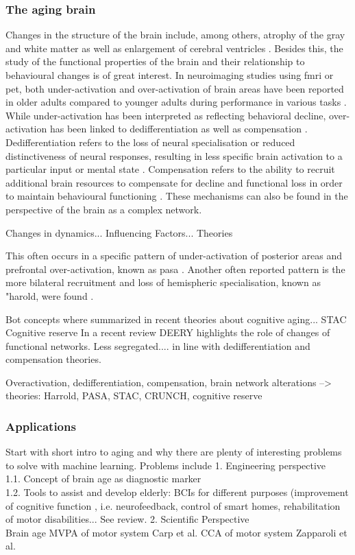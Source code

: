 \subsubsection{The aging brain}
Changes in the structure of the brain include, among others, atrophy of the gray and white matter as well as enlargement of cerebral ventricles \cite{Fjell2010}. Besides this, the study of the functional properties of the brain and their relationship to behavioural changes is of great interest. In neuroimaging studies using \gls{fmri} or \gls{pet}, both under-activation and over-activation of brain areas have been reported in older adults compared to younger adults during performance in various tasks \cite{Reuter-Lorenz2010}. While under-activation has been interpreted as reflecting behavioral decline, over-activation has been linked to dedifferentiation as well as compensation \cite{Grady2012}. Dedifferentiation refers to the loss of neural specialisation or reduced distinctiveness of neural responses, resulting in less specific brain activation to a particular input or mental state \cite{Festini2018}. Compensation refers to the ability to recruit additional brain resources to compensate for decline and functional loss in order to maintain behavioural functioning \cite{Reuter-Lorenz2010, Grady2012}. These mechanisms can also be found in the perspective of the brain as a complex network. 



Changes in dynamics... Influencing Factors... Theories 

This often occurs in a specific pattern of under-activation of posterior areas and prefrontal over-activation, known as \gls{pasa} \cite{Davis2007}. Another often reported pattern is the more bilateral recruitment and loss of hemispheric specialisation, known as "\gls{harold}, were found \cite{Cabeza2002}.

Bot concepts where summarized in recent theories about cognitive aging... STAC 
Cognitive reserve  
In a recent review DEERY highlights the role of changes of functional networks. Less segregated.... in line with dedifferentiation and compensation theories. 
\cite{Deery2023}


Overactivation, dedifferentiation, compensation, brain network alterations --> theories:  Harrold, PASA, STAC, CRUNCH, cognitive reserve

\subsubsection{Applications}
Start with short intro to aging and why there are plenty of interesting problems to solve with machine learning. Problems include
1. Engineering perspective\\
1.1. Concept of brain age as diagnostic marker\\  
1.2. Tools to assist and develop elderly: BCIs for different purposes (improvement of cognitive function  , i.e. neurofeedback, control of smart homes, rehabilitation of motor disabilities... See review. 
2. Scientific Perspective\\
Brain age 
MVPA of motor system Carp et al. 
CCA of motor system Zapparoli et al.



